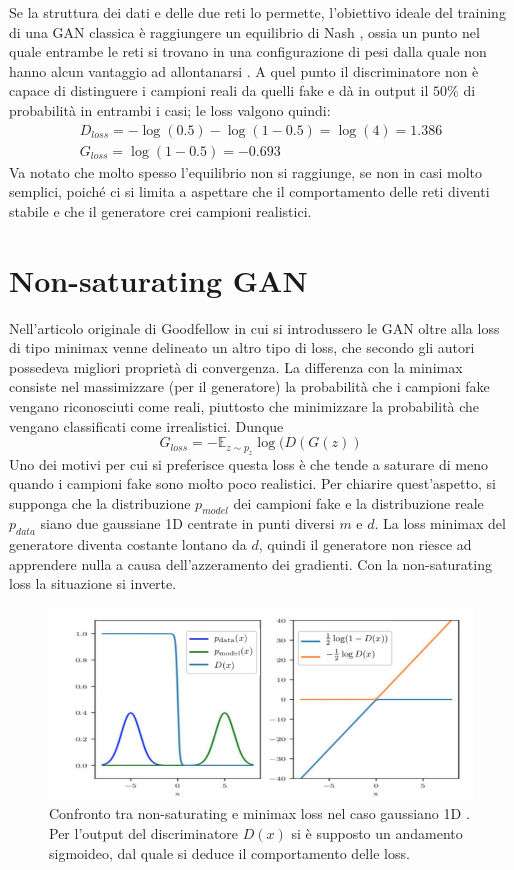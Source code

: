 \documentclass[Lau, noexaminfo, oneside]{sapthesis} %
\begin{document}
Se la struttura dei dati e delle due reti lo permette, l'obiettivo ideale del training di una GAN classica è raggiungere un equilibrio di Nash
\cite{Nash48}, ossia un punto nel quale entrambe le reti si trovano in una configurazione di pesi dalla quale non hanno alcun vantaggio ad allontanarsi  \cite{manypathsgan}. A quel punto il discriminatore non è capace di distinguere i campioni reali da quelli fake e dà in output il $50\%$ di probabilità in entrambi i casi; le loss valgono quindi:
\begin{align}
D_{loss} = - \log(0.5) - \log(1 - 0.5) = \log(4) = 1.386\\
G_{loss} = \log(1- 0.5) = - 0.693 
\end{align}
Va notato che molto spesso l'equilibrio non si raggiunge, se non in casi molto semplici, poiché ci si limita a aspettare che il comportamento delle reti diventi stabile e che il generatore crei campioni realistici.
\section{Non-saturating GAN}
\label{Non-saturating GAN}
Nell'articolo originale di Goodfellow\cite{goodfellowgan} in cui si introdussero le GAN oltre alla loss di tipo minimax venne delineato un altro tipo di loss, che secondo gli autori possedeva migliori proprietà di convergenza.
La differenza con la minimax consiste nel massimizzare (per il generatore) la probabilità che i campioni fake vengano riconosciuti come reali, piuttosto che minimizzare la probabilità che vengano classificati come irrealistici. Dunque 
\begin{equation}
G_{loss} = - \mathbb{E}_{z \sim p_z} \log(D(G(z))
\end{equation}
Uno dei motivi per cui si preferisce questa loss è che tende a saturare di meno quando i campioni fake sono molto poco realistici. Per chiarire quest'aspetto, si supponga che la distribuzione $p_{model}$ dei campioni fake e la distribuzione reale $p_{data}$ siano due gaussiane 1D centrate in punti diversi $m$ e $d$. La loss minimax del generatore diventa costante lontano da $d$, quindi il generatore non riesce ad apprendere nulla a causa dell'azzeramento dei gradienti. Con la non-saturating loss la situazione si inverte.
\begin{figure}[H]
\includegraphics[scale=0.5]{non-saturating-GAN.png}
\centering
\caption{Confronto tra non-saturating e minimax loss nel caso gaussiano 1D \cite{manypathsgan}. Per l'output del discriminatore $D(x)$ si è supposto un andamento sigmoideo, dal quale si deduce il comportamento delle loss.}
\end{figure}
\end{document}
